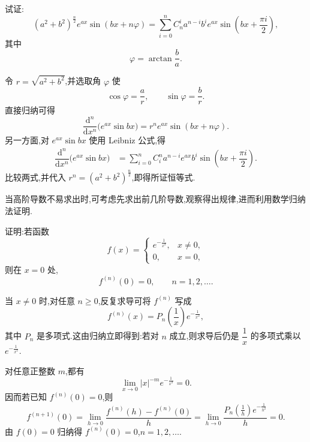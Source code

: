 \begin{example}
    试证:
    \[
        (a^2+b^2)^{\frac{n}{2}}e^{ax}\sin(bx+n\varphi)
        =\sum\limits_{i=0}^n C_{n}^{i}a^{n-i}b^i e^{ax}
        \sin\left(bx+\dfrac{\pi i}{2}\right),
    \]
    其中
    \[
        \varphi=\arctan\dfrac{b}{a}.
    \]
\end{example}
\exampleblank

\begin{solution}
    令 $r=\sqrt{a^2+b^2}$,并选取角 $\varphi$ 使
    \[
        \cos\varphi=\dfrac{a}{r},
        \qquad
        \sin\varphi=\dfrac{b}{r}.
    \]
    直接归纳可得
    \[
        \dfrac{\mathrm{d}^n}{\mathrm{d}x^n}
        \bigl(e^{ax}\sin bx\bigr)
        =r^n e^{ax}\sin(bx+n\varphi).
    \]
    另一方面,对 $e^{ax}\sin bx$ 使用 Leibniz 公式,得
    \[
        \begin{aligned}
            \dfrac{\mathrm{d}^n}{\mathrm{d}x^n}
            \bigl(e^{ax}\sin bx\bigr)
             & =\sum\limits_{i=0}^{n}C_{i}^{n}
            a^{n-i}e^{ax}b^i
            \sin\left(bx+\dfrac{\pi i}{2}\right).
        \end{aligned}
    \]
    比较两式,并代入 $r^n=(a^2+b^2)^{\frac{n}{2}}$,即得所证恒等式.
\end{solution}




当高阶导数不易求出时,可考虑先求出前几阶导数,观察得出规律,进而利用数学归纳法证明.

\begin{example}[\markstar]
    证明:若函数
    \[
        f(x)=
        \begin{cases}
            e^{-\frac{1}{x^2}}, & x\neq0, \\
            0,                  & x=0,
        \end{cases}
    \]
    则在 $x=0$ 处,
    \[
        f^{(n)}(0)=0,
        \qquad n=1,2,\ldots.
    \]
\end{example}
\exampleblank

\begin{solution}
    当 $x\neq0$ 时,对任意 $n\geq0$,反复求导可将 $f^{(n)}$ 写成
    \[
        f^{(n)}(x)=P_n\left(\dfrac{1}{x}\right)e^{-\frac{1}{x^2}},
    \]
    其中 $P_n$ 是多项式.这由归纳立即得到:若对 $n$ 成立,则求导后仍是 $\dfrac{1}{x}$ 的多项式乘以 $e^{-\frac{1}{x^2}}$.

    对任意正整数 $m$,都有
    \[
        \lim\limits_{x\to0}|x|^{-m}e^{-\frac{1}{x^2}}=0.
    \]
    因而若已知 $f^{(n)}(0)=0$,则
    \[
        f^{(n+1)}(0)
        =\lim\limits_{h\to0}\dfrac{f^{(n)}(h)-f^{(n)}(0)}{h}
        =\lim\limits_{h\to0}
        \dfrac{P_n\left(\frac{1}{h}\right)e^{-\frac{1}{h^2}}}{h}=0.
    \]
    由 $f(0)=0$ 归纳得 $f^{(n)}(0)=0$,$n=1,2,\ldots$.
\end{solution}

